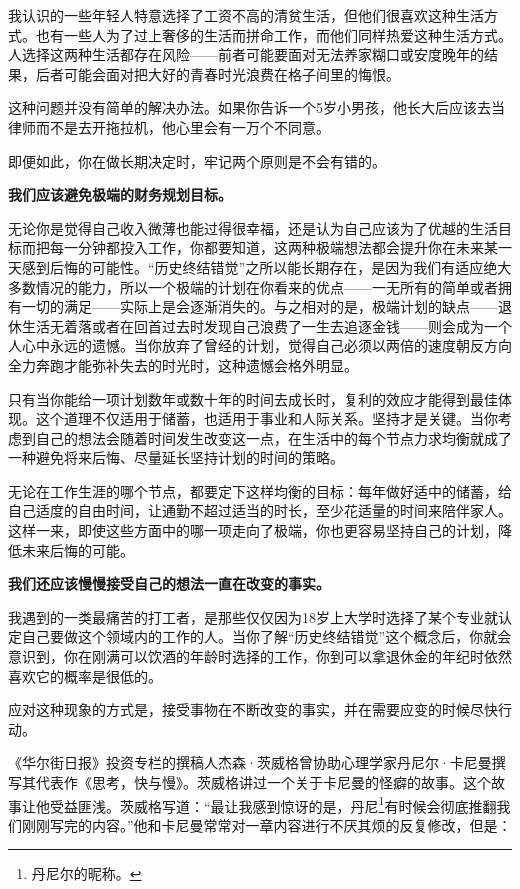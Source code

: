 我认识的一些年轻人特意选择了工资不高的清贫生活，但他们很喜欢这种生活方式。也有一些人为了过上奢侈的生活而拼命工作，而他们同样热爱这种生活方式。人选择这两种生活都存在风险——前者可能要面对无法养家糊口或安度晚年的结果，后者可能会面对把大好的青春时光浪费在格子间里的悔恨。

这种问题并没有简单的解决办法。如果你告诉一个5岁小男孩，他长大后应该去当律师而不是去开拖拉机，他心里会有一万个不同意。

即便如此，你在做长期决定时，牢记两个原则是不会有错的。

\textbf{我们应该避免极端的财务规划目标。}

无论你是觉得自己收入微薄也能过得很幸福，还是认为自己应该为了优越的生活目标而把每一分钟都投入工作，你都要知道，这两种极端想法都会提升你在未来某一天感到后悔的可能性。“历史终结错觉”之所以能长期存在，是因为我们有适应绝大多数情况的能力，所以一个极端的计划在你看来的优点——一无所有的简单或者拥有一切的满足——实际上是会逐渐消失的。与之相对的是，极端计划的缺点——退休生活无着落或者在回首过去时发现自己浪费了一生去追逐金钱——则会成为一个人心中永远的遗憾。当你放弃了曾经的计划，觉得自己必须以两倍的速度朝反方向全力奔跑才能弥补失去的时光时，这种遗憾会格外明显。

只有当你能给一项计划数年或数十年的时间去成长时，复利的效应才能得到最佳体现。这个道理不仅适用于储蓄，也适用于事业和人际关系。坚持才是关键。当你考虑到自己的想法会随着时间发生改变这一点，在生活中的每个节点力求均衡就成了一种避免将来后悔、尽量延长坚持计划的时间的策略。

无论在工作生涯的哪个节点，都要定下这样均衡的目标：每年做好适中的储蓄，给自己适度的自由时间，让通勤不超过适当的时长，至少花适量的时间来陪伴家人。这样一来，即使这些方面中的哪一项走向了极端，你也更容易坚持自己的计划，降低未来后悔的可能。

\textbf{我们还应该慢慢接受自己的想法一直在改变的事实。}

我遇到的一类最痛苦的打工者，是那些仅仅因为18岁上大学时选择了某个专业就认定自己要做这个领域内的工作的人。当你了解“历史终结错觉”这个概念后，你就会意识到，你在刚满可以饮酒的年龄时选择的工作，你到可以拿退休金的年纪时依然喜欢它的概率是很低的。

应对这种现象的方式是，接受事物在不断改变的事实，并在需要应变的时候尽快行动。

《华尔街日报》投资专栏的撰稿人杰森·茨威格曾协助心理学家丹尼尔·卡尼曼撰写其代表作《思考，快与慢》。茨威格讲过一个关于卡尼曼的怪癖的故事。这个故事让他受益匪浅。茨威格写道：“最让我感到惊讶的是，丹尼\footnote{丹尼尔的昵称。}有时候会彻底推翻我们刚刚写完的内容。”他和卡尼曼常常对一章内容进行不厌其烦的反复修改，但是：

